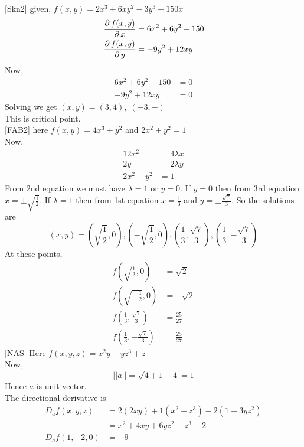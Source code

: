 \documentclass[12pt]{article}
\begin{document}
[Skn2] given, \(f(x,y)=2x^3+6xy^2-3y^3-150x\)\\
\begin{align*}
    \,\frac{\partial\, f(x,y)}{\partial\, x}&=6x^2+6y^2-150\\
    \,\frac{\partial\, f(x,y)}{\partial\, y}&=-9y^2+12xy
\end{align*}
Now,
\begin{align*}
    6x^2+6y^2-150&=0\\
    -9y^2+12xy&=0
\end{align*}
Solving we get \((x,y)=(3,4),\;(-3,-
)\)\\
This is critical point.\\

[FAB2] here \(f(x,y)=4x^3+y^2\) and \(2x^2+y^2=1\)\\
Now,
\begin{align*}
    12x^2&=4\lambda x\\
    2y&=2\lambda y\\
    2x^2+y^2&=1
\end{align*}
From 2nd equation we must have \(\lambda=1\) or \(y=0\). If \(y=0\) then from 3rd equation \(x=\pm\sqrt{\frac{1}{2}}\). If \(\lambda=1\) then from 1st equation \(x=\frac{1}{3}\) and \(y=\pm \frac{\sqrt{7}}{3}\). So the solutions are
\[
    (x,y)=\left( \sqrt{\frac{1}{2}},0 \right), \left( -\sqrt{\frac{1}{2}},0 \right),\left( \frac{1}{3},\frac{\sqrt{7}}{3} \right),\left( \frac{1}{3},-\frac{\sqrt{7}}{3} \right)
\]
At these points,
\begin{align*}
    f\left( \sqrt{\frac{1}{2}},0 \right)&=\sqrt{2}\\
    f\left( \sqrt{-\frac{1}{2}},0 \right)&=-\sqrt{2}\\
    f\left( \frac{1}{3},\frac{\sqrt{7}}{3} \right)&=\frac{25}{27}\\
    f\left( \frac{1}{3},-\frac{\sqrt{7}}{3} \right)&=\frac{25}{27}
\end{align*}
[NAS] Here \(f(x,y,z)=x^2y-yz^3+z\)\\
Now,
\[\vert\vert a \vert\vert=\sqrt{4+1-4}=1\]
Hence \(a\) is unit vector.\\
The directional derivative is
\begin{align*}
    D_a f(x,y,z)&=2(2xy)+1(x^2-z^3)-2(1-3yz^2)\\
    &=x^2+4 x y+6 y z^2-z^3-2\\
    D_a f(1,-2,0)&=-9
\end{align*}
\end{document}
